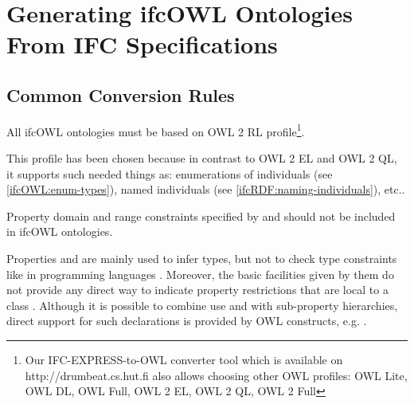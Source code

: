 
\section{Generating ifcOWL Ontologies From IFC Specifications}
\label{sec:ifcOWL}

\subsection{Common Conversion Rules}


\begin{ontologyRule}
All ifc\-OWL ontologies must be based on OWL 2 RL profile\footnote{Our IFC-EXPRESS-to-OWL converter tool which is available on http://drumbeat.cs.hut.fi also allows choosing other OWL profiles: OWL Lite, OWL DL, OWL Full, OWL 2 EL, OWL 2 QL, OWL 2 Full}.
\end{ontologyRule}

This profile has been chosen because in contrast to OWL 2 EL and OWL 2 QL, it supports such needed things as: enumerations of individuals (see \ref{ifcOWL:enum-types}), named individuals (see \ref{ifcRDF:naming-individuals}), etc.\cite{w3c:owl2-profiles}.

\begin{ontologyRule}
Property domain and range constraints specified by  and  should not be included in ifcOWL ontologies.
\end{ontologyRule}

Properties  and  are mainly used to infer types, but not to check type constraints like in programming languages \cite{w3c:owl-guide}. Moreover, the basic facilities given by them do not provide any direct way to indicate property restrictions that are local to a class \cite{w3c:rdf-schema}. Although it is possible to combine use  and  with sub-property hierarchies, direct support for such declarations is provided by OWL constructs, e.g. .

